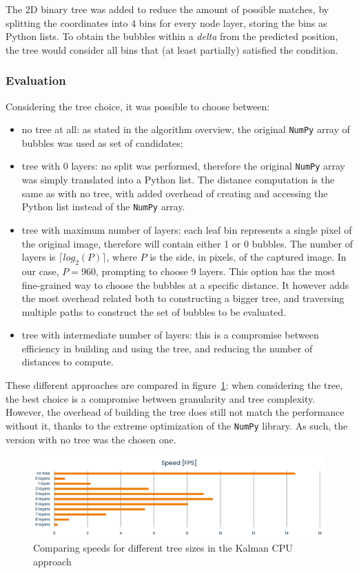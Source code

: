 The 2D binary tree was added to reduce the amount of possible matches, by splitting the coordinates into 4 bins for every node layer, storing the bins as Python lists.
To obtain the bubbles within a \textit{delta} from the predicted position, the tree would consider all bins that (at least partially) satisfied the condition.

\subsubsection{Evaluation}

Considering the tree choice, it was possible to choose between:
\begin{itemize}
	\itemsep 0em
	\item no tree at all: as stated in the algorithm overview, the original \texttt{NumPy} array of bubbles was used as set of candidates;
	\item tree with 0 layers: no split was performed, therefore the original \texttt{NumPy} array was simply translated into a Python list. The distance computation is the same as with no tree, with added overhead of creating and accessing the Python list instead of the \texttt{NumPy} array.
	\item tree with maximum number of layers: each leaf bin represents a single pixel of the original image, therefore will contain either 1 or 0 bubbles. The number of layers is $\lceil log_2(P) \rceil$, where $P$ is the side, in pixels, of the captured image. In our case, $P{=}960$, prompting to choose 9 layers. This option has the most fine-grained way to choose the bubbles at a specific distance. It however adds the most overhead related both to constructing a bigger tree, and traversing multiple paths to construct the set of bubbles to be evaluated.
	\item tree with intermediate number of layers: this is a compromise between efficiency in building and using the tree, and reducing the number of distances to compute.
\end{itemize}
These different approaches are compared in figure~\ref{fig:linkDD:kalmancpu:speed-cmp}: when considering the tree, the best choice is a compromise between granularity and tree complexity.
However, the overhead of building the tree does still not match the performance without it, thanks to the extreme optimization of the \texttt{NumPy} library.
As such, the version with no tree was the chosen one.

\begin{figure}
	\centerline{\includegraphics[width=\locateimgsize]{images/link-2dtree-speeds.png}}
	\caption{\centering Comparing speeds for different tree sizes in the Kalman CPU \linkDD* approach}
	\label{fig:linkDD:kalmancpu:speed-cmp}
\end{figure}

